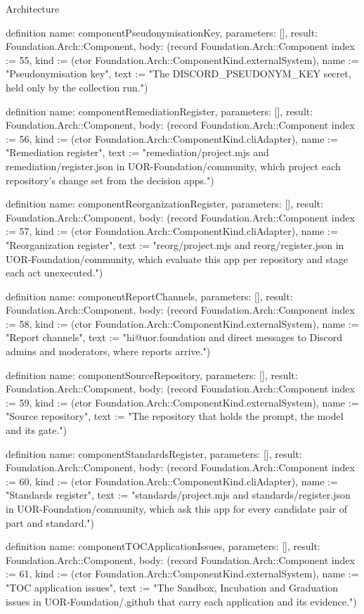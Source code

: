 \begin{lexlean}{Architecture}
\begin{semanticmodule}
definition{
  name: componentPseudonymisationKey,
  parameters: [],
  result: Foundation.Arch::Component,
  body: (record Foundation.Arch::Component {index := 55, kind := (ctor Foundation.Arch::ComponentKind.externalSystem), name := "Pseudonymisation key", text := "The DISCORD_PSEUDONYM_KEY secret, held only by the collection run."})
}

definition{
  name: componentRemediationRegister,
  parameters: [],
  result: Foundation.Arch::Component,
  body: (record Foundation.Arch::Component {index := 56, kind := (ctor Foundation.Arch::ComponentKind.cliAdapter), name := "Remediation register", text := "remediation/project.mjs and remediation/register.json in UOR-Foundation/community, which project each repository's change set from the decision apps."})
}

definition{
  name: componentReorganizationRegister,
  parameters: [],
  result: Foundation.Arch::Component,
  body: (record Foundation.Arch::Component {index := 57, kind := (ctor Foundation.Arch::ComponentKind.cliAdapter), name := "Reorganization register", text := "reorg/project.mjs and reorg/register.json in UOR-Foundation/community, which evaluate this app per repository and stage each act unexecuted."})
}

definition{
  name: componentReportChannels,
  parameters: [],
  result: Foundation.Arch::Component,
  body: (record Foundation.Arch::Component {index := 58, kind := (ctor Foundation.Arch::ComponentKind.externalSystem), name := "Report channels", text := "hi@uor.foundation and direct messages to Discord admins and moderators, where reports arrive."})
}

definition{
  name: componentSourceRepository,
  parameters: [],
  result: Foundation.Arch::Component,
  body: (record Foundation.Arch::Component {index := 59, kind := (ctor Foundation.Arch::ComponentKind.externalSystem), name := "Source repository", text := "The repository that holds the prompt, the model and its gate."})
}

definition{
  name: componentStandardsRegister,
  parameters: [],
  result: Foundation.Arch::Component,
  body: (record Foundation.Arch::Component {index := 60, kind := (ctor Foundation.Arch::ComponentKind.cliAdapter), name := "Standards register", text := "standards/project.mjs and standards/register.json in UOR-Foundation/community, which ask this app for every candidate pair of part and standard."})
}

definition{
  name: componentTOCApplicationIssues,
  parameters: [],
  result: Foundation.Arch::Component,
  body: (record Foundation.Arch::Component {index := 61, kind := (ctor Foundation.Arch::ComponentKind.externalSystem), name := "TOC application issues", text := "The Sandbox, Incubation and Graduation issues in UOR-Foundation/.github that carry each application and its evidence."})
}


\end{semanticmodule}
\end{lexlean}
